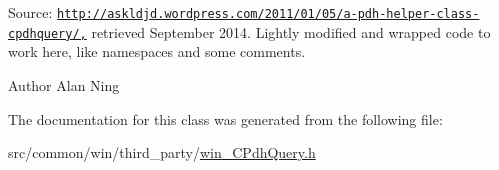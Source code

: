 Source\+: \href{http://askldjd.wordpress.com/2011/01/05/a-pdh-helper-class-cpdhquery/,}{\tt http\+://askldjd.\+wordpress.\+com/2011/01/05/a-\/pdh-\/helper-\/class-\/cpdhquery/,} retrieved September 2014. Lightly modified and wrapped code to work here, like namespaces and some comments. \begin{DoxyAuthor}{Author}
Alan Ning 
\end{DoxyAuthor}


The documentation for this class was generated from the following file\+:\begin{DoxyCompactItemize}
\item 
src/common/win/third\+\_\+party/\hyperlink{win___c_pdh_query_8h}{win\+\_\+\+C\+Pdh\+Query.\+h}\end{DoxyCompactItemize}
